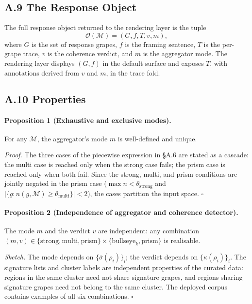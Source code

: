 \documentclass[11pt]{article}
\begin{document}
\subsection*{A.9 The Response Object}
The full response object returned to the rendering layer is the tuple
\[
\mathcal{O}(\mathcal{M}) = (G, f, T, v, m),
\]
where $G$ is the set of response grapes, $f$ is the framing sentence, $T$ is the per-grape trace, $v$ is the coherence verdict, and $m$ is the aggregator mode. The rendering layer displays $(G, f)$ in the default surface and exposes $T$, with annotations derived from $v$ and $m$, in the trace fold.

\subsection*{A.10 Properties}

\paragraph{Proposition 1 (Exhaustive and exclusive modes).}
For any $\mathcal{M}$, the aggregator's mode $m$ is well-defined and unique.

\emph{Proof.} The three cases of the piecewise expression in \S A.6 are stated as a cascade: the multi case is reached only when the strong case fails; the prism case is reached only when both fail. Since the strong, multi, and prism conditions are jointly negated in the prism case ($\max n < \theta_{\mathrm{strong}}$ and $|\{ g : n(g, \mathcal{M}) \geq \theta_{\mathrm{multi}} \}| < 2$), the cases partition the input space. $\square$

\paragraph{Proposition 2 (Independence of aggregator and coherence detector).}
The mode $m$ and the verdict $v$ are independent: any combination $(m, v) \in \{\mathrm{strong}, \mathrm{multi}, \mathrm{prism}\} \times \{\mathrm{bullseye}_k, \mathrm{prism}\}$ is realisable.

\emph{Sketch.} The mode depends on $\{ \bar\sigma(\rho_i) \}_i$; the verdict depends on $\{ \kappa(\rho_i) \}_i$. The signature lists and cluster labels are independent properties of the curated data: regions in the same cluster need not share signature grapes, and regions sharing signature grapes need not belong to the same cluster. The deployed corpus contains examples of all six combinations. $\square$
\end{document}
